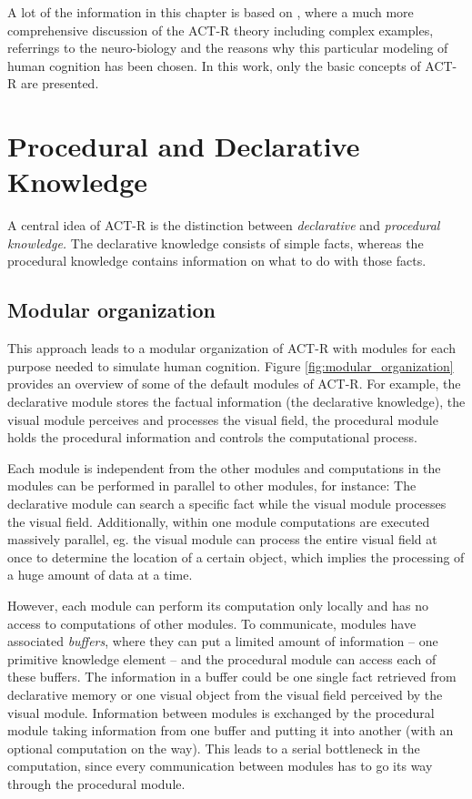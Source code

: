 A lot of the information in this chapter is based on \cite{anderson_how_2007, anderson_integrated_2004, taatgen_modeling_2006}, where a much more comprehensive discussion of the ACT-R theory including complex examples, referrings to the neuro-biology and the reasons why this particular modeling of human cognition has been chosen. In this work, only the basic concepts of ACT-R are presented.

\section{Procedural and Declarative Knowledge}

A central idea of ACT-R is the distinction between \emph{declarative} and \emph{procedural knowledge.} The declarative knowledge consists of simple facts, whereas the procedural knowledge contains information on what to do with those facts.

\subsection{Modular organization}

This approach leads to a modular organization of ACT-R with modules for each purpose needed to simulate human cognition. Figure \ref{fig:modular_organization} provides an overview of some of the default modules of ACT-R. For example, the declarative module stores the factual information (the declarative knowledge), the visual module perceives and processes the visual field, the procedural module holds the procedural information and controls the computational process. 

Each module is independent from the other modules and computations in the modules can be performed in parallel to other modules, for instance: The declarative module can search a specific fact while the visual module processes the visual field. Additionally, within one module computations are executed massively parallel, eg. the visual module can process the entire visual field at once to determine the location of a certain object, which implies the processing of a huge amount of data at a time.

However, each module can perform its computation only locally and has no access to computations of other modules. To communicate, modules have associated \emph{buffers}, where they can put a limited amount of information -- one primitive knowledge element -- and the procedural module can access each of these buffers. The information in a buffer could be one single fact retrieved from declarative memory or one visual object from the visual field perceived by the visual module. Information between modules is exchanged by the procedural module taking information from one buffer and putting it into another (with an optional computation on the way). This leads to a serial bottleneck in the computation, since every communication between modules has to go its way through the procedural module.

